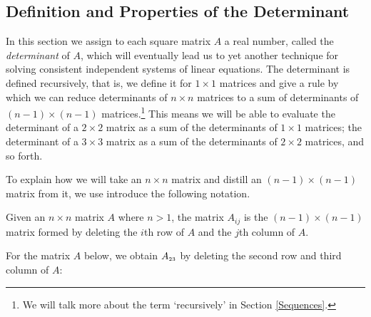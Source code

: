 \documentclass{ximera}
\begin{document}
	\author{Stitz-Zeager}




\setcounter{footnote}{0}

\label{Determinants}

\setlength{\extrarowheight}{0pt}

\subsection{Definition and Properties of the Determinant}

\label{determinantdefnandprops}

In this section we assign to each square matrix $A$ a real number, called the \textit{determinant} of $A$, which will eventually lead us to yet another technique for solving consistent independent systems of linear equations.  The determinant is defined recursively, that is, we define it for $1 \times 1$ matrices and give a rule by which we can reduce determinants of $n \times n$ matrices to a sum of determinants of $(n-1) \times (n-1)$ matrices.\footnote{We will talk more about the term `recursively' in Section \ref{Sequences}.}  This means we will be able to evaluate the determinant of a $2 \times 2$ matrix as a sum of the determinants of $1 \times 1$ matrices;  the determinant of a $3 \times 3$ matrix as a sum of the determinants of $2 \times 2$ matrices, and so forth.  

To explain how we will take an $n \times n$ matrix and distill an $(n-1) \times (n-1)$ matrix from it, we use introduce the following notation.

\smallskip

\begin{definition} \label{Aijdefn} Given an $n \times n$ matrix $A$ where $n>1$, the matrix $A_{ij}$ is the $(n-1) \times (n-1)$ matrix formed by deleting the $i$th row of $A$ and the $j$th column of $A$. 
\end{definition}

\smallskip

For the matrix $A$ below, we obtain $A_{\mbox{\tiny$23$}}$ by deleting the second row and third column of $A$:
\end{document}
